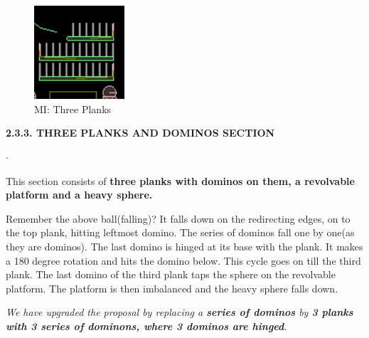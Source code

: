\documentclass{report}
\begin{document}
\begin{figure}
\begin{center}
\includegraphics[width=0.3\textwidth, height=0.2\textwidth]{latex/box2d_3.png}
\end{center}
\caption{MI: Three Planks}
\vspace{-10pt}
\end{figure}
\textbf{2.3.3. THREE PLANKS AND DOMINOS SECTION}
\begin{list}{$\cdot$}{\setlength{\leftmargin}{0em}}
\item This section consists of \textbf{three planks with dominos\cite{dominos} on them, a revolvable platform \cite{revolute_joint} and a heavy sphere.}
\item Remember the above ball(falling)? It falls down on the redirecting edges, on to the top plank, hitting leftmost domino. The series of dominos fall one by one(as they are dominos). The last domino is hinged\cite{revolute_joint} at its base with the plank. It makes a 180 degree rotation and hits the domino below. This cycle goes on till the third plank. The last domino of the third plank taps the sphere on the revolvable platform. The platform is then imbalanced and the heavy sphere falls down.
\item \emph{We have upgraded the proposal by replacing a \textbf{series of dominos} by \textbf{3 planks with 3 series of dominons, where 3 dominos are hinged}.}
\end{list}

\pagebreak
\end{document}
